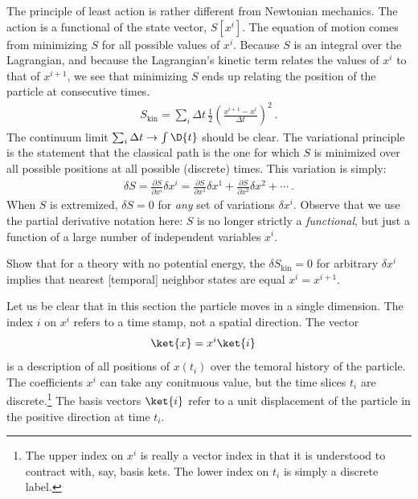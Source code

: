 The principle of least action is rather different from Newtonian mechanics. The action is a functional of the state vector, $S[x^i]$. The equation of motion comes from minimizing $S$ for all possible values of $x^i$. Because $S$ is an integral over the Lagrangian, and because the Lagrangian's kinetic term relates the values of $x^i$ to that of $x^{i+1}$, we see that minimizing $S$ ends up relating the position of the particle at consecutive times.
\begin{align}
    S_\text{kin} = 
    \sum_{i} \Delta t \,
    \frac{1}{2} 
    \left(
        \frac{ x^{i+1} - x^i }{ \Delta t }
    \right)^2 \ .
\end{align}
The continuum limit $\sum_i \Delta t \to \int \D{t}$ should be clear. The variational principle is the statement that the classical path is the one for which $S$ is minimized over all possible positions at all possible (discrete) times. This variation is simply:
\begin{align}
    \delta S = \frac{\partial{S}}{\partial{x^i}}\delta x^i
    = 
    \frac{\partial{S}}{\partial{x^1}}\delta x^1
    +
    \frac{\partial{S}}{\partial{x^2}}\delta x^2
    + 
    \cdots \ .
    \label{eq:S:partial}
\end{align}
When $S$ is extremized, $\delta S = 0$ for \emph{any} set of variations $\delta x^i$.  Observe that we use the partial derivative notation here: $S$ is no longer strictly a \emph{functional}, but just a function of a large number of independent variables $x^i$. 
\begin{exercise}
Show that for a theory with no potential energy, the $\delta S_\text{kin}=0$ for arbitrary $\delta x^i$ implies that nearest [temporal] neighbor states are equal $x^i = x^{i+1}$. 
\end{exercise}

Let us be clear that in this section the particle moves in a single dimension. The index $i$ on $x^i$ refers to a time stamp, not a spatial direction. The vector 
\begin{align}
    \ket{x} &= x^i \ket{i} 
\end{align}
is a description of all positions of $x(t_i)$ over the temoral history of the particle. The coefficients $x^i$ can take any conitnuous value, but the time slices $t_i$ are discrete.\footnote{The upper index on $x^i$ is really a vector index in that it is understood to contract with, say, basis kets. The lower index on $t_i$ is simply a discrete label.} The basis vectors $\ket{i}$ refer to a unit displacement of the particle in the positive direction at time $t_i$.




